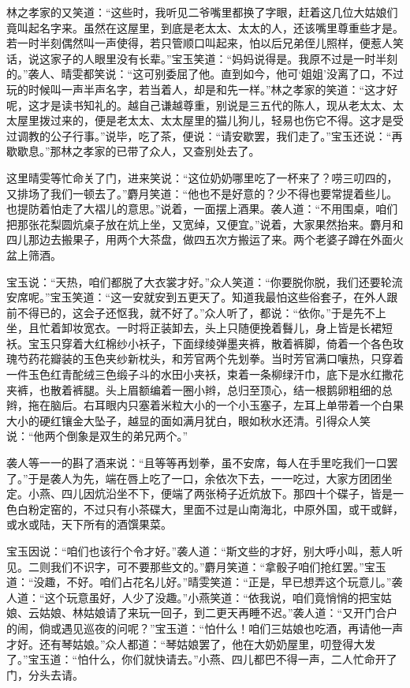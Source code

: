 \documentclass[12pt,oneside]{book}
\begin{document}
林之孝家的又笑道：“这些时，我听见二爷嘴里都换了字眼，赶着这几位大姑娘们竟叫起名字来。虽然在这屋里，到底是老太太、太太的人，还该嘴里尊重些才是。若一时半刻偶然叫一声使得，若只管顺口叫起来，怕以后兄弟侄儿照样，便惹人笑话，说这家子的人眼里没有长辈。”宝玉笑道：“妈妈说得是。我原不过是一时半刻的。”袭人、晴雯都笑说：“这可别委屈了他。直到如今，他可‘姐姐’没离了口，不过玩的时候叫一声半声名字，若当着人，却是和先一样。”林之孝家的笑道：“这才好呢，这才是读书知礼的。越自己谦越尊重，别说是三五代的陈人，现从老太太、太太屋里拨过来的，便是老太太、太太屋里的猫儿狗儿，轻易也伤它不得。这才是受过调教的公子行事。”说毕，吃了茶，便说：“请安歇罢，我们走了。”宝玉还说：“再歇歇息。”那林之孝家的已带了众人，又查别处去了。

这里晴雯等忙命关了门，进来笑说：“这位奶奶哪里吃了一杯来了？唠三叨四的，又排场了我们一顿去了。”麝月笑道：“他也不是好意的？少不得也要常提着些儿。也提防着怕走了大褶儿的意思。”说着，一面摆上酒果。袭人道：“不用围桌，咱们把那张花梨圆炕桌子放在炕上坐，又宽绰，又便宜。”说着，大家果然抬来。麝月和四儿那边去搬果子，用两个大茶盘，做四五次方搬运了来。两个老婆子蹲在外面火盆上筛酒。

宝玉说：“天热，咱们都脱了大衣裳才好。”众人笑道：“你要脱你脱，我们还要轮流安席呢。”宝玉笑道：“这一安就安到五更天了。知道我最怕这些俗套子，在外人跟前不得已的，这会子还怄我，就不好了。”众人听了，都说：“依你。”于是先不上坐，且忙着卸妆宽衣。一时将正装卸去，头上只随便挽着䰖儿，身上皆是长裙短袄。宝玉只穿着大红棉纱小袄子，下面绿绫弹墨夹裤，散着裤脚，倚着一个各色玫瑰芍药花瓣装的玉色夹纱新枕头，和芳官两个先划拳。当时芳官满口嚷热，只穿着一件玉色红青酡绒三色缎子斗的水田小夹袄，束着一条柳绿汗巾，底下是水红撒花夹裤，也散着裤腿。头上眉额编着一圈小辫，总归至顶心，结一根鹅卵粗细的总辫，拖在脑后。右耳眼内只塞着米粒大小的一个小玉塞子，左耳上单带着一个白果大小的硬红镶金大坠子，越显的面如满月犹白，眼如秋水还清。引得众人笑说：“他两个倒象是双生的弟兄两个。”

袭人等一一的斟了酒来说：“且等等再划拳，虽不安席，每人在手里吃我们一口罢了。”于是袭人为先，端在唇上吃了一口，余依次下去，一一吃过，大家方团团坐定。小燕、四儿因炕沿坐不下，便端了两张椅子近炕放下。那四十个碟子，皆是一色白粉定窑的，不过只有小茶碟大，里面不过是山南海北，中原外国，或干或鲜，或水或陆，天下所有的酒馔果菜。

宝玉因说：“咱们也该行个令才好。”袭人道：“斯文些的才好，别大呼小叫，惹人听见。二则我们不识字，可不要那些文的。”麝月笑道：“拿骰子咱们抢红罢。”宝玉道：“没趣，不好。咱们占花名儿好。”晴雯笑道：“正是，早已想弄这个玩意儿。”袭人道：“这个玩意虽好，人少了没趣。”小燕笑道：“依我说，咱们竟悄悄的把宝姑娘、云姑娘、林姑娘请了来玩一回子，到二更天再睡不迟。”袭人道：“又开门合户的闹，倘或遇见巡夜的问呢？”宝玉道：“怕什么！咱们三姑娘也吃酒，再请他一声才好。还有琴姑娘。”众人都道：“琴姑娘罢了，他在大奶奶屋里，叨登得大发了。”宝玉道：“怕什么，你们就快请去。”小燕、四儿都巴不得一声，二人忙命开了门，分头去请。
\end{document}
